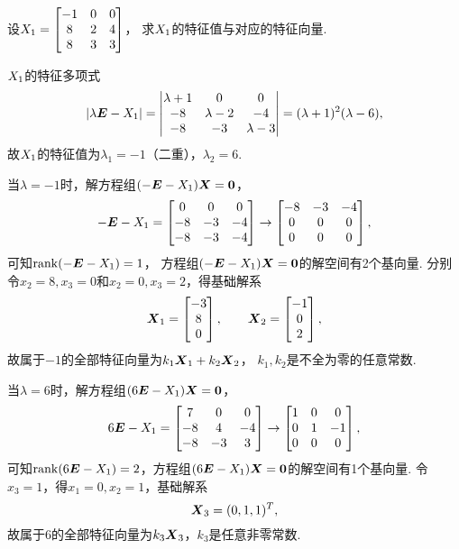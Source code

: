 \begin{example}
设\(X_1 = \begin{bmatrix}
	-1 & 0 & 0 \\
	8 & 2 & 4 \\
	8 & 3 & 3
\end{bmatrix}\)，
求\(X_1\)的特征值与对应的特征向量.
\begin{solution}
\(X_1\)的特征多项式\[
	\abs{\lambda\boldsymbol{E}-X_1}
	= \begin{vmatrix}
		\lambda+1 & 0 & 0 \\
		-8 & \lambda-2 & -4 \\
		-8 & -3 & \lambda-3
	\end{vmatrix}
	= (\lambda+1)^2 (\lambda-6),
\]
故\(X_1\)的特征值为\(\lambda_1=-1\)（二重），\(\lambda_2=6\).

当\(\lambda=-1\)时，解方程组\((-\boldsymbol{E}-X_1)\boldsymbol{X} = \boldsymbol{0}\)，\[
	-\boldsymbol{E}-X_1 = \begin{bmatrix}
		0 & 0 & 0 \\
		-8 & -3 & -4 \\
		-8 & -3 & -4
	\end{bmatrix} \to \begin{bmatrix}
		-8 & -3 & -4 \\
		0 & 0 & 0 \\
		0 & 0 & 0
	\end{bmatrix},
\]
可知\(\rank(-\boldsymbol{E}-X_1) = 1\)，
方程组\((-\boldsymbol{E}-X_1)\boldsymbol{X} = \boldsymbol{0}\)的解空间有2个基向量.
分别令\(x_2 = 8, x_3 = 0\)和\(x_2 = 0, x_3 = 2\)，得基础解系\[
	\boldsymbol{X}_1 = \begin{bmatrix} -3 \\ 8 \\ 0 \end{bmatrix},
	\qquad
	\boldsymbol{X}_2 = \begin{bmatrix} -1 \\ 0 \\ 2 \end{bmatrix},
\]
故属于\(-1\)的全部特征向量为\(k_1 \boldsymbol{X}_1 + k_2 \boldsymbol{X}_2\)，
\(k_1,k_2\)是不全为零的任意常数.

当\(\lambda=6\)时，解方程组\((6\boldsymbol{E}-X_1)\boldsymbol{X} = \boldsymbol{0}\)，\[
	6\boldsymbol{E}-X_1 = \begin{bmatrix}
		7 & 0 & 0 \\
		-8 & 4 & -4 \\
		-8 & -3 & 3
	\end{bmatrix} \to \begin{bmatrix}
		1 & 0 & 0 \\
		0 & 1 & -1 \\
		0 & 0 & 0
	\end{bmatrix},
\]
可知\(\rank(6\boldsymbol{E}-X_1) = 2\)，方程组\((6\boldsymbol{E}-X_1)\boldsymbol{X} = \boldsymbol{0}\)的解空间有1个基向量.
令\(x_3 = 1\)，得\(x_1 = 0, x_2 = 1\)，基础解系\[
	\boldsymbol{X}_3 = (0,1,1)^T,
\]
故属于\(6\)的全部特征向量为\(k_3 \boldsymbol{X}_3\)，\(k_3\)是任意非零常数.
\end{solution}
\end{example}

